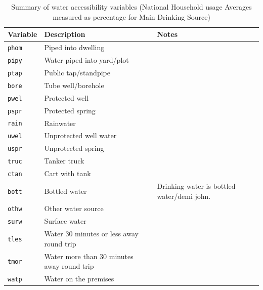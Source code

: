 \documentclass[10pt,twoside]{article}
\numberwithin{equation}{section}
\newcommand{\?}{\stackrel{?}{=}}
\begin{document}
\begin{table}[h!]
  \centering
  \begin{tabular}{p{1in} p{3in} p{2in}}\toprule
    \bf Variable & \bf Description & \bf Notes \\\midrule
 \texttt{phom} & Piped into dwelling & 
 \\\midrule
 \texttt{pipy} & Water piped into yard/plot
& 
\\\midrule
    \texttt{ptap} &  Public tap/standpipe
 & 
 \\\midrule
 \texttt{bore} & Tube well/borehole & 
\\\midrule
\texttt{pwel} & Protected well
& 
\\\midrule
\texttt{pspr} & Protected spring
& 
\\\midrule

\texttt{rain} & Rainwater
& 
\\\midrule
\texttt{uwel} & Unprotected well water
&
\\\midrule
\texttt{uspr} & Unprotected spring
& 
\\\midrule

 \texttt{truc} & Tanker truck & 
\\\midrule
 \texttt{ctan} & Cart with tank & 
\\\midrule
 \texttt{bott} & Bottled water & Drinking water is bottled water/demi john.
\\\midrule
 \texttt{othw} & Other water source & 
\\\midrule
\texttt{surw} & Surface water
& 
\\\midrule
\texttt{tles} & Water 30 minutes or less away round trip
& 
\\\midrule 
\texttt{tmor} & Water more than 30 minutes away round trip & 
\\\midrule
 \texttt{watp} & Water on the premises
 & 
 \\\bottomrule
  \end{tabular}
  \caption{Summary of water accessibility variables (National Household usage Averages measured as percentage for Main Drinking Source)}
  \label{tab:summary-wa}
\end{table}
\end{document}
